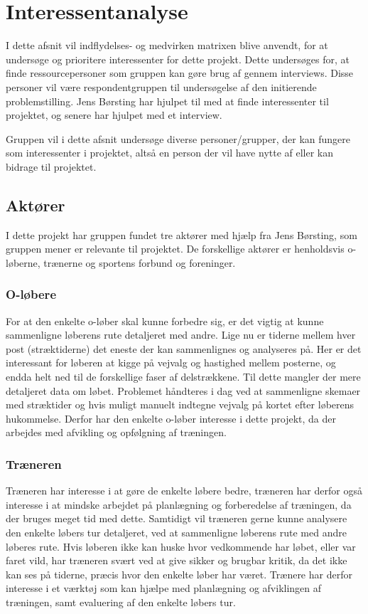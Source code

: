 \newpage
\section{Interessentanalyse}
I dette afsnit vil indflydelses- og medvirken matrixen blive anvendt, for at undersøge og prioritere interessenter for dette projekt. Dette undersøges for, at finde ressourcepersoner som gruppen kan gøre brug af gennem interviews. Disse personer vil være respondentgruppen til undersøgelse af den initierende problemstilling.
Jens Børsting har hjulpet til med at finde interessenter til projektet, og senere har hjulpet med et interview.

Gruppen vil i dette afsnit undersøge diverse personer/grupper, der kan fungere som interessenter i projektet, altså en person der vil have nytte af eller kan bidrage til projektet.

\subsection{Aktører}
I dette projekt har gruppen fundet tre aktører med hjælp fra Jens Børsting, som gruppen mener er relevante til projektet. De forskellige aktører er henholdsvis o-løberne, trænerne og sportens forbund og foreninger. 

\subsubsection{O-løbere}
For at den enkelte o-løber skal kunne forbedre sig, er det vigtig at kunne sammenligne løberens rute detaljeret med andre. Lige nu er tiderne mellem hver post (stræktiderne) det eneste der kan sammenlignes og analyseres på. Her er det interessant for løberen at kigge på vejvalg og hastighed mellem posterne, og endda helt ned til de forskellige faser af delstrækkene. Til dette mangler der mere detaljeret data om løbet. Problemet håndteres i dag ved at sammenligne skemaer med stræktider og hvis muligt manuelt indtegne vejvalg på kortet efter løberens hukommelse. Derfor har den enkelte o-løber interesse i dette projekt, da der arbejdes med afvikling og opfølgning af træningen. 

\subsubsection{Træneren}
Træneren har interesse i at gøre de enkelte løbere bedre, træneren har derfor også interesse i at mindske arbejdet på planlægning og forberedelse af træningen, da der bruges meget tid med dette. Samtidigt vil træneren gerne kunne analysere den enkelte løbers tur detaljeret, ved at sammenligne løberens rute med andre løberes rute. Hvis løberen ikke kan huske hvor vedkommende har løbet, eller var faret vild, har træneren svært ved at give sikker og brugbar kritik, da det ikke kan ses på tiderne, præcis hvor den enkelte løber har været. Trænere har derfor interesse i et værktøj som kan hjælpe med planlægning og afviklingen af træningen, samt evaluering af den enkelte løbers tur.

